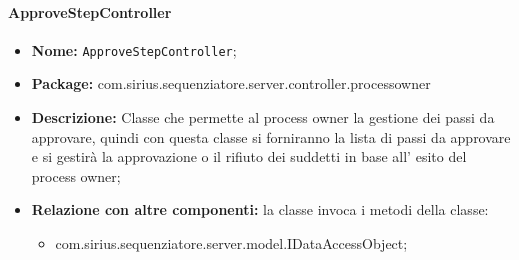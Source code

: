 \paragraph{ApproveStepController}
	\begin{itemize}
		\item \textbf{Nome:} \texttt{ApproveStepController};
		\item \textbf{Package:} com.sirius.sequenziatore.server.controller.processowner
		\item \textbf{Descrizione:} Classe che permette al process owner la gestione dei passi da approvare, quindi con questa classe si forniranno la lista di passi da approvare e si gestirà la approvazione o il rifiuto dei suddetti in base all' esito del process owner;
		\item \textbf{Relazione con altre componenti:} la classe invoca i metodi della classe:
		\begin{itemize}
			\item com.sirius.sequenziatore.server.model.IDataAccessObject;
		\end{itemize}
	\end{itemize}
